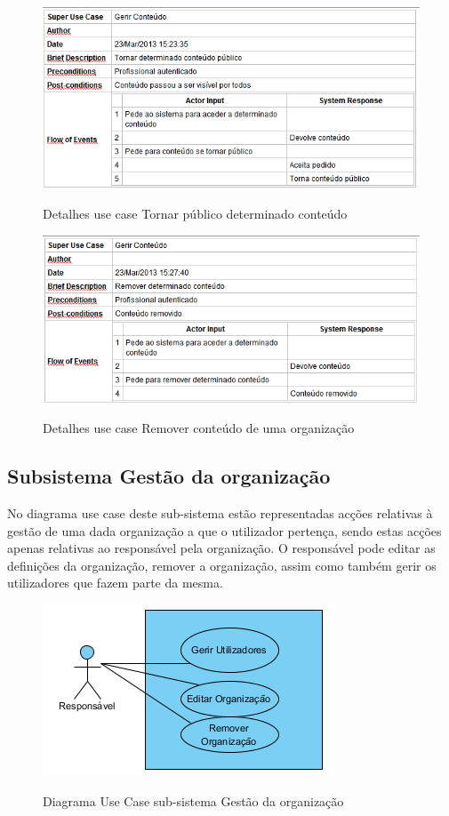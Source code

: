 \documentclass[12pt,a4paper]{article}
\begin{document}
\begin{figure}[h!]
\centering
\includegraphics[scale=0.7]{d_usecase/tornarpublico}
\label{usecase}
\caption{Detalhes use case Tornar público determinado conteúdo}
\end{figure}

\begin{figure}[h!]
\centering
\includegraphics[scale=0.7]{d_usecase/removerconteudo}
\label{usecase}
\caption{Detalhes use case Remover conteúdo de uma organização}
\end{figure}


\clearpage
\clearpage
\subsection{Subsistema Gestão da organização}
No diagrama use case deste sub-sistema estão representadas acções relativas à gestão de uma dada organização a que o utilizador pertença, sendo estas acções apenas relativas ao responsável pela organização. O responsável pode editar as definições da organização, remover a organização, assim como também gerir os utilizadores que fazem parte da mesma.\\

\begin{figure}[h!]
\centering
\includegraphics[scale=1]{usecase/R_GerirOrganizacao}
\label{usecase}
\caption{Diagrama Use Case sub-sistema Gestão da organização}
\end{figure}
\end{document}
